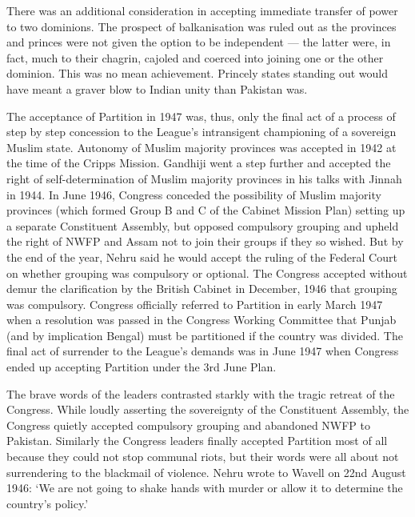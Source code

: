 \begin{multicols}{2}
There was an additional consideration in accepting immediate transfer of power to two dominions. The prospect of balkanisation was ruled out as the provinces and princes were not given the option to be independent --- the latter were, in fact, much to their chagrin, cajoled and coerced into joining one or the other dominion. This was no mean achievement. Princely states standing out would have meant a graver blow to Indian unity than Pakistan was. 

The acceptance of Partition in 1947 was, thus, only the final act of a process of step by step concession to the League's intransigent championing of a sovereign Muslim state. Autonomy of Muslim majority provinces was accepted in 1942 at the time of the Cripps Mission. Gandhiji went a step further and accepted the right of self-determination of Muslim majority provinces in his talks with Jinnah in 1944. In June 1946, Congress conceded the possibility of Muslim majority provinces (which formed Group B and C of the Cabinet Mission Plan) setting up a separate Constituent Assembly, but opposed compulsory grouping and upheld the right of NWFP and Assam not to join their groups if they so wished. But by the end of the year, Nehru said he would accept the ruling of the Federal Court on whether grouping was compulsory or optional. The Congress accepted without demur the clarification by the British Cabinet in December, 1946 that grouping was compulsory. Congress officially referred to Partition in early March 1947 when a resolution was passed in the Congress Working Committee that Punjab (and by implication Bengal) must be partitioned if the country was divided. The final act of surrender to the League's demands was in June 1947 when Congress ended up accepting Partition under the 3rd June Plan. 

The brave words of the leaders contrasted starkly with the tragic retreat of the Congress. While loudly asserting the sovereignty of the Constituent Assembly, the Congress quietly accepted compulsory grouping and abandoned NWFP to Pakistan. Similarly the Congress leaders finally accepted Partition most of all because they could not stop communal riots, but their words were all about not surrendering to the blackmail of violence. Nehru wrote to Wavell on 22nd August 1946: `We are not going to shake hands with murder or allow it to determine the country's policy.' 


\end{multicols}
